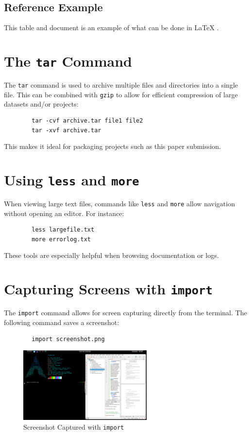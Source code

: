 \documentclass[11pt]{article}
\begin{document}
	\subsection*{Reference Example}
	This table and document is an example of what can be done in LaTeX \cite{latex}.
	
	\section{The \texttt{tar} Command}
	The \texttt{tar} command is used to archive multiple files and directories into a single file. This can be combined with \texttt{gzip} to allow for efficient compression of large datasets and/or projects:
	\begin{verbatim}
		tar -cvf archive.tar file1 file2
		tar -xvf archive.tar
	\end{verbatim}
	This makes it ideal for packaging projects such as this paper submission.
	
	\section{Using \texttt{less} and \texttt{more}}
	When viewing large text files, commands like \texttt{less} and \texttt{more} allow navigation without opening an editor. For instance:
	\begin{verbatim}
		less largefile.txt
		more errorlog.txt
	\end{verbatim}
	These tools are especially helpful when browsing documentation or logs.
	
	\section{Capturing Screens with \texttt{import}}
	The \texttt{import} command allows for screen capturing directly from the terminal. The following command saves a screenshot:
	\begin{verbatim}
		import screenshot.png
	\end{verbatim}
	\begin{figure}[H]
		\centering
		\includegraphics[width=0.6\textwidth]{screenshot.png}
		\caption{Screenshot Captured with \texttt{import}}
	\end{figure}
	
\end{document}
